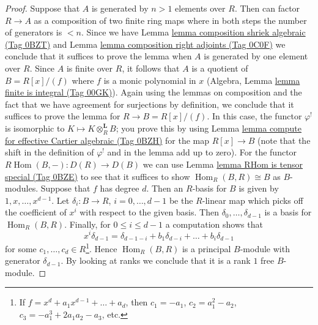 \documentclass{amsart}
\theoremstyle{plain}
\theoremstyle{definition}
\theoremstyle{remark}
\numberwithin{equation}{subsection}
\def\Hom{\mathop{\mathrm{Hom}}\nolimits}
\begin{document}
\begin{proof}
Suppose that $A$ is generated by $n > 1$ elements over $R$.
Then can factor $R \to A$ as a composition of two finite ring maps
where in both steps the number of generators is $< n$.
Since we have Lemma \href{https://stacks.math.columbia.edu/tag/0BZT}{lemma composition shriek algebraic (Tag 0BZT)} and
Lemma \href{https://stacks.math.columbia.edu/tag/0C0F}{lemma composition right adjoints (Tag 0C0F)}
we conclude that it suffices
to prove the lemma when $A$ is generated by one element over $R$.
Since $A$ is finite over $R$, it follows that $A$ is a quotient
of $B = R[x]/(f)$ where $f$ is a monic polynomial in $x$
(Algebra, Lemma \href{https://stacks.math.columbia.edu/tag/00GK}{lemma finite is integral (Tag 00GK)}).
Again using the lemmas on composition and the fact that we
have agreement for surjections by definition, we conclude that
it suffices to prove the lemma for $R \to B = R[x]/(f)$.
In this case, the functor $\varphi^!$ is isomorphic to
$K \mapsto K \otimes_R^\mathbf{L} B$; you prove this by
using Lemma \href{https://stacks.math.columbia.edu/tag/0BZH}{lemma compute for effective Cartier algebraic (Tag 0BZH)}
for the map $R[x] \to B$ (note that the shift in the definition
of $\varphi^!$ and in the lemma add up to zero).
For the functor $R\Hom(B, -) : D(R) \to D(B)$ we can use
Lemma \href{https://stacks.math.columbia.edu/tag/0BZE}{lemma RHom is tensor special (Tag 0BZE)}
to see that it suffices to show $\Hom_R(B, R) \cong B$
as $B$-modules. Suppose that $f$ has degree $d$.
Then an $R$-basis for $B$ is given by $1, x, \ldots, x^{d - 1}$.
Let $\delta_i : B \to R$, $i = 0, \ldots, d - 1$
be the $R$-linear map which picks off the coefficient
of $x^i$ with respect to the given basis. Then
$\delta_0, \ldots, \delta_{d - 1}$ is a basis for $\Hom_R(B, R)$.
Finally, for $0 \leq i \leq d - 1$ a computation shows that
$$
x^i \delta_{d - 1} =
\delta_{d - 1 - i} + b_1 \delta_{d - i} + \ldots + b_i \delta_{d - 1}
$$
for some $c_1, \ldots, c_d \in R$\footnote{If
$f = x^d + a_1 x^{d - 1} + \ldots + a_d$, then
$c_1 = -a_1$, $c_2 = a_1^2 - a_2$, $c_3 = -a_1^3 + 2a_1a_2 -a_3$, etc.}.
Hence $\Hom_R(B, R)$ is a principal $B$-module with generator
$\delta_{d - 1}$. By looking
at ranks we conclude that it is a rank $1$ free $B$-module.
\end{proof}
\end{document}
